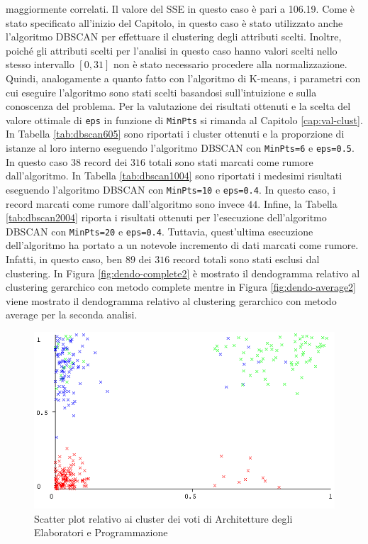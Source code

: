 \documentclass[12pt]{article}
\begin{document}
maggiormente correlati. Il valore del SSE in questo caso è pari a 106.19. Come è stato specificato all'inizio del Capitolo, in questo caso è stato utilizzato anche l'algoritmo DBSCAN per effettuare il clustering degli attributi scelti. Inoltre, poiché gli attributi scelti per l'analisi in questo caso hanno valori scelti nello stesso intervallo $[0,31]$ non è stato necessario procedere alla normalizzazione. Quindi, analogamente a quanto fatto con l'algoritmo di K-means, i parametri con cui eseguire l'algoritmo sono stati scelti basandosi sull'intuizione e sulla conoscenza del problema. Per la valutazione dei risultati ottenuti e la scelta del valore ottimale di \texttt{eps} in funzione di \texttt{MinPts} si rimanda al Capitolo \ref{cap:val-clust}. In Tabella \ref{tab:dbscan605} sono riportati i cluster ottenuti e la proporzione di istanze al loro interno eseguendo l'algoritmo DBSCAN con \texttt{MinPts=6} e \texttt{eps=0.5}. In questo caso $38$ record dei $316$ totali sono stati marcati come rumore dall'algoritmo. In Tabella \ref{tab:dbscan1004} sono riportati i medesimi risultati eseguendo l'algoritmo DBSCAN con \texttt{MinPts=10} e \texttt{eps=0.4}. In questo caso, i record marcati come rumore dall'algoritmo sono invece $44$. Infine, la Tabella \ref{tab:dbscan2004} riporta i risultati ottenuti per l'esecuzione dell'algoritmo DBSCAN con \texttt{MinPts=20} e \texttt{eps=0.4}. Tuttavia, quest'ultima esecuzione dell'algoritmo ha portato a un notevole incremento di dati marcati come rumore. Infatti, in questo caso, ben $89$ dei $316$ record totali sono stati esclusi dal clustering. In Figura \ref{fig:dendo-complete2} è mostrato il dendogramma relativo al clustering gerarchico con metodo complete mentre in Figura \ref{fig:dendo-average2} viene mostrato il dendogramma relativo al clustering gerarchico con metodo average per la seconda analisi. 
\begin{figure}[H]
	\includegraphics[width=\textwidth]{img/ARC-PRG-Cluster.png}
	\captionsetup{justification=centering}
	\caption{Scatter plot relativo ai cluster dei voti di Architetture degli Elaboratori e Programmazione}
	\label{APC}
\end{figure}
\end{document}
